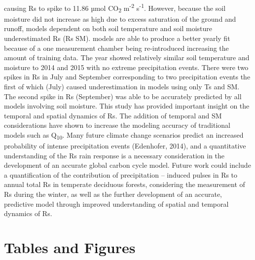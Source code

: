\documentclass[]{elsarticle} %
\begin{document}
causing Rs to spike to 11.86 µmol CO\textsubscript{2}
m\textsuperscript{-2} s\textsuperscript{-1}. However, because the soil
moisture did not increase as high due to excess saturation of the ground
and runoff, models dependent on both soil temperature and soil moisture
underestimated Rs (Rs SM). \newline {} models are able to
produce a better yearly fit because of a one measurement chamber being
re-introduced increasing the amount of training data. The year showed
relatively similar soil temperature and moisture to 2014 and 2015 with
no extreme precipitation events. There were two spikes in Rs in July and
September corresponding to two precipitation events the first of which
(July) caused underestimation in models using only Ts and SM. The second
spike in Rs (September) was able to be accurately predicted by all
models involving soil moisture. \newline \newline This study has
provided important insight on the temporal and spatial dynamics of Rs.
The addition of temporal and SM considerations have shown to increase
the modeling accuracy of traditional models such as Q\textsubscript{10}.
Many future climate change scenarios predict an increased probability of
intense precipitation events (Edenhofer, 2014), and a quantitative
understanding of the Rs rain response is a necessary consideration in
the development of an accurate global carbon cycle model. Future work
could include a quantification of the contribution of precipitation --
induced pulses in Rs to annual total Rs in temperate deciduous forests,
considering the measurement of Rs during the winter, as well as the
further development of an accurate, predictive model through improved
understanding of spatial and temporal dynamics of Rs.

\pagebreak

\hypertarget{tables-and-figures}{%
\section{Tables and Figures}\label{tables-and-figures}}
\end{document}
